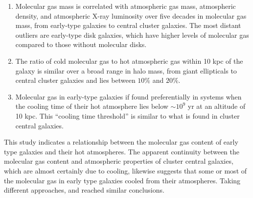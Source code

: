 \documentclass[iop]{emulateapj}
\begin{document}
\begin{enumerate}
\item[(i)]  Molecular gas mass is correlated with atmospheric gas mass, atmospheric density, and atmospheric X-ray luminosity over five decades in molecular gas mass, from early-type galaxies to central cluster galaxies. The most distant outliers are early-type disk galaxies, which have higher levels of molecular gas compared to those without molecular disks. 

\item[(ii)] The ratio of cold molecular gas to hot atmospheric gas within 10 kpc of the galaxy is similar over a broad range in halo mass, from giant ellipticals to central cluster galaxies and lies between $10\%$ and $20\%$. 

\item[(iii)] Molecular gas in early-type galaxies if found preferentially in systems when the cooling time of their hot atmosphere lies below $\sim 10^9$ yr at an altitude of 10 kpc. This ``cooling time threshold'' is similar to what is found in cluster central galaxies.  
 



\end{enumerate}

This study indicates a relationship between the molecular gas content of early type galaxies and their hot atmospheres.  The apparent continuity between the molecular gas content and atmospheric properties of cluster central galaxies, which are almost certainly due to cooling,  likewise suggests that some or most of the molecular gas in early type galaxies cooled from their atmospheres. Taking different approaches, \citet{Werner:14} and \citet{Werner:18new} reached similar conclusions.  
\end{document}
